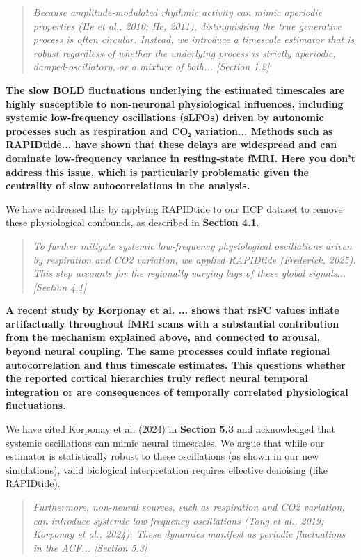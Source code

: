 \documentclass[docs/main.tex]{subfiles}
\newcommand{\reviewercomment}[1]{\vspace{0.3cm}\noindent\textbf{#1}\vspace{0.15cm}}
\newcommand{\manuscriptquote}[1]{\begin{quote}\textit{#1}\end{quote}}
\begin{document}
\manuscriptquote{Because amplitude-modulated rhythmic activity can mimic aperiodic properties (He et al., 2010; He, 2011), distinguishing the true generative process is often circular. Instead, we introduce a timescale estimator that is robust regardless of whether the underlying process is strictly aperiodic, damped-oscillatory, or a mixture of both... [Section 1.2]}

\reviewercomment{The slow BOLD fluctuations underlying the estimated timescales are highly susceptible to non-neuronal physiological influences, including systemic low-frequency oscillations (sLFOs) driven by autonomic processes such as respiration and CO₂ variation... Methods such as RAPIDtide... have shown that these delays are widespread and can dominate low-frequency variance in resting-state fMRI. Here you don't address this issue, which is particularly problematic given the centrality of slow autocorrelations in the analysis.}

We have addressed this by applying RAPIDtide to our HCP dataset to remove these physiological confounds, as described in \textbf{Section 4.1}.

\manuscriptquote{To further mitigate systemic low-frequency physiological oscillations driven by respiration and CO2 variation, we applied RAPIDtide (Frederick, 2025). This step accounts for the regionally varying lags of these global signals... [Section 4.1]}

\reviewercomment{A recent study by Korponay et al. ... shows that rsFC values inflate artifactually throughout fMRI scans with a substantial contribution from the mechanism explained above, and connected to arousal, beyond neural coupling. The same processes could inflate regional autocorrelation and thus timescale estimates. This questions whether the reported cortical hierarchies truly reflect neural temporal integration or are consequences of temporally correlated physiological fluctuations.}

We have cited Korponay et al. (2024) in \textbf{Section 5.3} and acknowledged that systemic oscillations can mimic neural timescales. We argue that while our estimator is statistically robust to these oscillations (as shown in our new simulations), valid biological interpretation requires effective denoising (like RAPIDtide).

\manuscriptquote{Furthermore, non-neural sources, such as respiration and CO2 variation, can introduce systemic low-frequency oscillations (Tong et al., 2019; Korponay et al., 2024). These dynamics manifest as periodic fluctuations in the ACF... [Section 5.3]}
\end{document}
